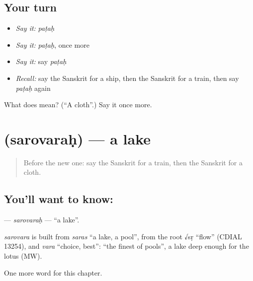 \subsection*{Your turn}
\begin{itemize}
\raggedright
  \item \emph{Say it:} \emph{paṭaḥ}
  \item \emph{Say it:} \emph{paṭaḥ}, once more
  \item \emph{Say it:} say \emph{paṭaḥ}
  \item \emph{Recall:} say the Sanskrit for a ship, then the Sanskrit for a train, then say \emph{paṭaḥ} again
\end{itemize}

\begin{tcolorbox}[breakable,colback=teal!4,colframe=teal!35!black,title={Before you move on}]
What does  mean? (\textquotedblleft{}A cloth\textquotedblright{}.) Say it once more.
\end{tcolorbox}
\section[\texorpdfstring{\sk{सरोवरः} (sarovaraḥ)}{सरोवरः (sarovaraḥ)}]{ (sarovaraḥ) — a lake}

\label{lesson:SA-C124-sarovarah}



\begin{quote}
Before the new one: say the Sanskrit for a train, then the Sanskrit for a cloth.
\end{quote}

\subsection*{You'll want to know: }
\textbf{} — \emph{sarovaraḥ} — \textquotedblleft{}a lake\textquotedblright{}.

\begin{cousinweb}
\emph{sarovara} is built from \emph{saras} \textquotedblleft{}a lake, a pool\textquotedblright{}, from the root √sṛ \textquotedblleft{}flow\textquotedblright{} (CDIAL 13254), and \emph{vara} \textquotedblleft{}choice, best\textquotedblright{}: \textquotedblleft{}the finest of pools\textquotedblright{}, a lake deep enough for the lotus (MW).
\end{cousinweb}

\begin{grammarlens}[title={What you've built}]
One more word for this chapter.
\end{grammarlens}

